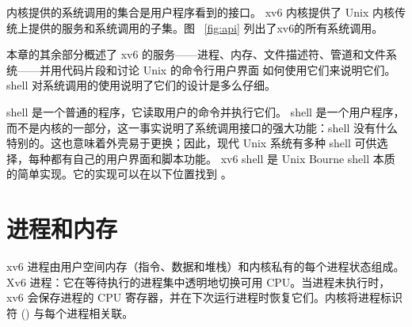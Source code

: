 内核提供的系统调用的集合是用户程序看到的接口。 xv6 内核提供了 Unix 内核传统上提供的服务和系统调用的子集。图~   \ref{fig:api}   列出了xv6的所有系统调用。  

本章的其余部分概述了 xv6 的服务——进程、内存、文件描述符、管道和文件系统——并用代码片段和讨论 Unix 的命令行用户界面        如何使用它们来说明它们。 shell 对系统调用的使用说明了它们的设计是多么仔细。  

shell 是一个普通的程序，它读取用户的命令并执行它们。 shell 是一个用户程序，而不是内核的一部分，这一事实说明了系统调用接口的强大功能：shell 没有什么特别的。这也意味着外壳易于更换；因此，现代 Unix 系统有多种 shell 可供选择，每种都有自己的用户界面和脚本功能。 xv6 shell 是 Unix Bourne shell 本质的简单实现。它的实现可以在以下位置找到
        。
    \section{进程和内存  }     

xv6 进程由用户空间内存（指令、数据和堆栈）和内核私有的每个进程状态组成。 Xv6
        进程：它在等待执行的进程集中透明地切换可用 CPU。当进程未执行时，xv6 会保存进程的 CPU 寄存器，并在下次运行进程时恢复它们。内核将进程标识符 () 与每个进程相关联。 


